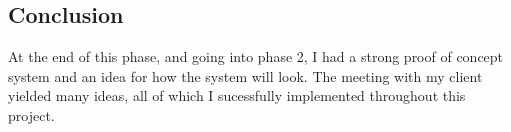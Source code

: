 \subsection{Conclusion}
At the end of this phase, and going into phase 2, I had a strong proof of concept system and an idea for how the system will look. The meeting with my client yielded many ideas, all of which I sucessfully implemented throughout this project. 
